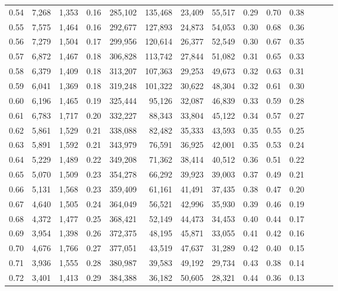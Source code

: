 \begin{tabular}{rrrrrrrrrrrrrr}
0.54 &  7,268 &  1,353 &  0.16 &  285,102 &  135,468 &  23,409 &  55,517 &  0.29 &  0.70 &      0.38 \\
0.55 &  7,575 &  1,464 &  0.16 &  292,677 &  127,893 &  24,873 &  54,053 &  0.30 &  0.68 &      0.36 \\
0.56 &  7,279 &  1,504 &  0.17 &  299,956 &  120,614 &  26,377 &  52,549 &  0.30 &  0.67 &      0.35 \\
0.57 &  6,872 &  1,467 &  0.18 &  306,828 &  113,742 &  27,844 &  51,082 &  0.31 &  0.65 &      0.33 \\
0.58 &  6,379 &  1,409 &  0.18 &  313,207 &  107,363 &  29,253 &  49,673 &  0.32 &  0.63 &      0.31 \\
0.59 &  6,041 &  1,369 &  0.18 &  319,248 &  101,322 &  30,622 &  48,304 &  0.32 &  0.61 &      0.30 \\
0.60 &  6,196 &  1,465 &  0.19 &  325,444 &   95,126 &  32,087 &  46,839 &  0.33 &  0.59 &      0.28 \\
0.61 &  6,783 &  1,717 &  0.20 &  332,227 &   88,343 &  33,804 &  45,122 &  0.34 &  0.57 &      0.27 \\
0.62 &  5,861 &  1,529 &  0.21 &  338,088 &   82,482 &  35,333 &  43,593 &  0.35 &  0.55 &      0.25 \\
0.63 &  5,891 &  1,592 &  0.21 &  343,979 &   76,591 &  36,925 &  42,001 &  0.35 &  0.53 &      0.24 \\
0.64 &  5,229 &  1,489 &  0.22 &  349,208 &   71,362 &  38,414 &  40,512 &  0.36 &  0.51 &      0.22 \\
0.65 &  5,070 &  1,509 &  0.23 &  354,278 &   66,292 &  39,923 &  39,003 &  0.37 &  0.49 &      0.21 \\
0.66 &  5,131 &  1,568 &  0.23 &  359,409 &   61,161 &  41,491 &  37,435 &  0.38 &  0.47 &      0.20 \\
0.67 &  4,640 &  1,505 &  0.24 &  364,049 &   56,521 &  42,996 &  35,930 &  0.39 &  0.46 &      0.19 \\
0.68 &  4,372 &  1,477 &  0.25 &  368,421 &   52,149 &  44,473 &  34,453 &  0.40 &  0.44 &      0.17 \\
0.69 &  3,954 &  1,398 &  0.26 &  372,375 &   48,195 &  45,871 &  33,055 &  0.41 &  0.42 &      0.16 \\
0.70 &  4,676 &  1,766 &  0.27 &  377,051 &   43,519 &  47,637 &  31,289 &  0.42 &  0.40 &      0.15 \\
0.71 &  3,936 &  1,555 &  0.28 &  380,987 &   39,583 &  49,192 &  29,734 &  0.43 &  0.38 &      0.14 \\
0.72 &  3,401 &  1,413 &  0.29 &  384,388 &   36,182 &  50,605 &  28,321 &  0.44 &  0.36 &      0.13 \\

\end{tabular}
